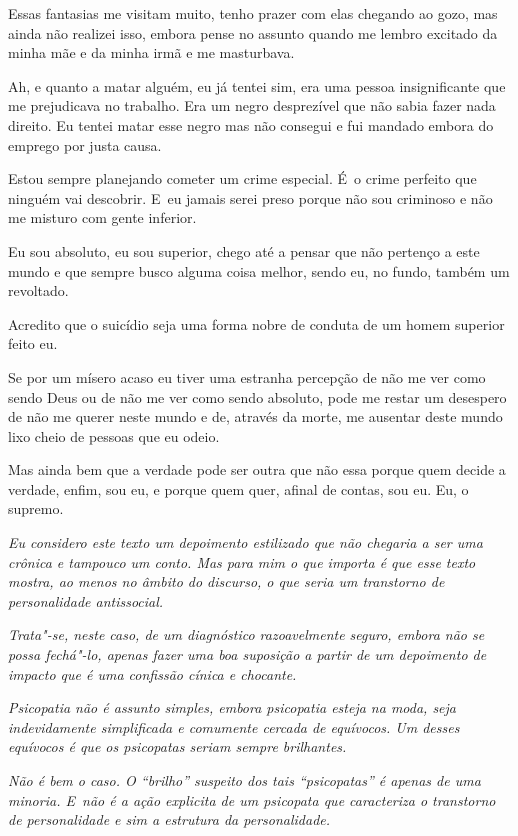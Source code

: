 Essas fantasias me visitam muito, tenho prazer com elas chegando ao
gozo, mas ainda não realizei isso, embora pense no assunto quando me
lembro excitado da minha mãe e da minha irmã e me masturbava.

Ah, e quanto a matar alguém, eu já tentei sim, era uma pessoa
insignificante que me prejudicava no trabalho. Era um negro desprezível
que não sabia fazer nada direito. Eu tentei matar esse negro mas não
consegui e fui mandado embora do emprego por justa causa.

Estou sempre planejando cometer um crime especial. É~o crime perfeito
que ninguém vai descobrir. E~eu jamais serei preso porque não sou
criminoso e não me misturo com gente inferior.

Eu sou absoluto, eu sou superior, chego até a pensar que não pertenço a
este mundo e que sempre busco alguma coisa melhor, sendo eu, no fundo,
também um revoltado.

Acredito que o suicídio seja uma forma nobre de conduta de um homem
superior feito eu.

Se por um mísero acaso eu tiver uma estranha percepção de não me ver
como sendo Deus ou de não me ver como sendo absoluto, pode me restar um
desespero de não me querer neste mundo e de, através da morte, me
ausentar deste mundo lixo cheio de pessoas que eu odeio.

Mas ainda bem que a verdade pode ser outra que não essa porque quem
decide a verdade, enfim, sou eu, e porque quem quer, afinal de contas,
sou eu. Eu, o supremo.~

\begin{center}\asterisc{}\end{center}


\emph{Eu considero este texto um depoimento estilizado que não chegaria
a ser uma crônica e tampouco um conto. Mas para mim o que importa é que
esse texto mostra, ao menos no âmbito do discurso, o que seria um
transtorno de personalidade antissocial.}~

\emph{Trata"-se, neste caso, de um diagnóstico razoavelmente seguro,
embora não se possa fechá"-lo, apenas fazer uma boa suposição a partir de
um depoimento de impacto que é uma confissão cínica e chocante.}~

\emph{Psicopatia não é assunto simples, embora psicopatia esteja na
moda, seja indevidamente simplificada e comumente cercada de equívocos.
Um desses equívocos é que os psicopatas seriam sempre brilhantes.}~

\emph{Não é bem o caso. O ``brilho'' suspeito dos tais ``psicopatas'' é
apenas de uma minoria. E~não é a ação explicita de um psicopata que
caracteriza o transtorno de personalidade e sim a estrutura da
personalidade.}~

